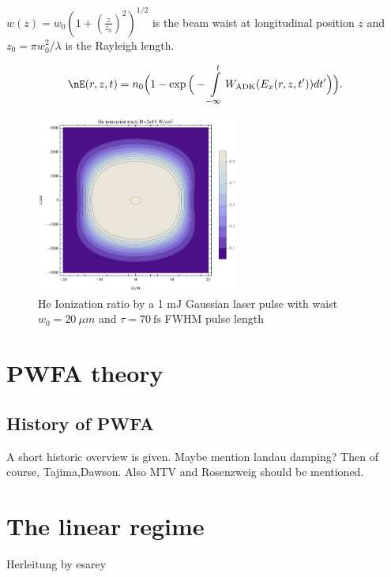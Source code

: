 $w(z)=w_0(1+(\frac{z}{z_0})^2)^{1/2}$ is the beam waist at longitudinal position $z$ and $z_0=\pi w_0^2/\lambda$ is the Rayleigh length.

\begin{equation}
\label{eqn:ADK_ionization_ratio}
\nE(r,z,t) = n_0 \Big(1-\exp\Big(-\int \limits_{-\infty}^t W_\mathrm{ADK}(E_{x}(r,z,t'))dt'\Big)\Big).
\end{equation}

\begin{figure}
\centering
\includegraphics[width=0.6\textwidth]{theory/images/raw/Ionization_Torch_contourplot.pdf}
\caption{He Ionization ratio by a 1 mJ Gaussian laser pulse with waist $w_0=20\ \mu m$ and $\tau = 70\ \mathrm{fs}$ FWHM pulse length}
\label{img:Torch_contourplot}

\end{figure}



\section{PWFA theory}
\subsection{History of PWFA}
A short historic overview is given. 
Maybe mention landau damping? Then of course, Tajima,Dawson. Also MTV and Rosenzweig should be mentioned.
\section{The linear regime}
Herleitung by esarey \cite{RevModPhys.81.1229}



